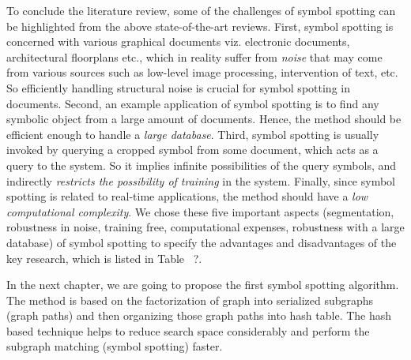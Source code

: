 To conclude the literature review, some of the challenges of symbol spotting can be highlighted from the above state-of-the-art reviews. First, symbol spotting is concerned with various graphical documents viz. electronic documents, architectural floorplans etc., which in reality suffer from \emph{noise} that may come from various sources such as low-level image processing, intervention of text, etc. So efficiently handling structural noise is crucial for symbol spotting in documents. Second, an example application of symbol spotting is to find any symbolic object from a large amount of documents. Hence, the method should be efficient enough to handle a \emph{large database}. Third, symbol spotting is usually invoked by querying a cropped symbol from some document, which acts as a query to the system. So it implies infinite possibilities of the query symbols, and indirectly \emph{restricts the possibility of training} in the system. Finally, since symbol spotting is related to real-time applications, the method should have a \emph{low computational complexity}. We chose these five important aspects (segmentation, robustness in noise, training free, computational expenses, robustness with a large database) of symbol spotting to specify the advantages and disadvantages of the key research, which is listed in Table~ ?.

In the next chapter, we are going to propose the first symbol spotting algorithm. The method is based on the factorization of graph into serialized subgraphs (graph paths) and then organizing those graph paths into hash table. The hash based technique helps to reduce search space considerably and perform the subgraph matching (symbol spotting) faster.